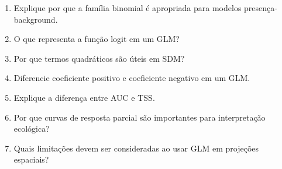 \begin{enumerate}
	\item Explique por que a família binomial é apropriada para modelos presença-background.
	\item O que representa a função logit em um GLM?
	\item Por que termos quadráticos são úteis em SDM?
	\item Diferencie coeficiente positivo e coeficiente negativo em um GLM.
	\item Explique a diferença entre AUC e TSS.
	\item Por que curvas de resposta parcial são importantes para interpretação ecológica?
	\item Quais limitações devem ser consideradas ao usar GLM em projeções espaciais?
\end{enumerate}



